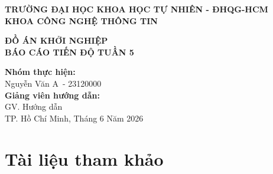 \documentclass[12pt,a4paper]{article}
\newcommand{\weeknumber}{5}
\newcommand{\reporttitle}{BÁO CÁO TIẾN ĐỘ TUẦN \weeknumber}
\newcommand{\subject}{ĐỒ ÁN KHỞI NGHIỆP}
\newcommand{\studentname}{Nguyễn Văn A}
\newcommand{\studentid}{23120000}
\newcommand{\instructor}{GV. Hướng dẫn}
\begin{document}
\begin{titlepage}
    \begin{center}
        \large
        \textbf{TRƯỜNG ĐẠI HỌC KHOA HỌC TỰ NHIÊN - ĐHQG-HCM} \\
        \textbf{KHOA CÔNG NGHỆ THÔNG TIN} \\
        \vspace{1cm}
        \vspace{1.5cm}
        
        \Large
        \textcolor{primary}{\textbf{\subject}} \\
        \vspace{1cm}
        \huge
        \textcolor{primary}{\textbf{\reporttitle}} \\
        \vspace{1.5cm}
        
        \large
        \textbf{Nhóm thực hiện:} \\
        \studentname\ - \studentid \\
        \vspace{1cm}
        \textbf{Giảng viên hướng dẫn:} \\
        \instructor \\
        
        \vfill
        \large
        TP. Hồ Chí Minh, Tháng 6 Năm 2026
    \end{center}
\end{titlepage}

\newpage
\tableofcontents
\newpage




\section{Tài liệu tham khảo}


\end{document}
